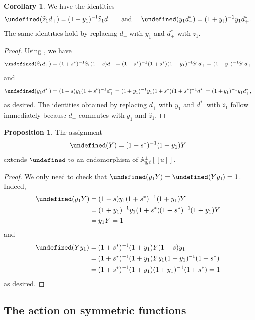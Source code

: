 \documentclass[reqno]{amsart}
\theoremstyle{plain}
\theoremstyle{definition}
\newtheorem{corollary}[theorem]{Corollary}
\newtheorem{proposition}[theorem]{Proposition}
\theoremstyle{remark}
\newcommand{\A}{\mathbb{A}}%
\newcommand{\z}{\widehat{z}}
\let\oldTheta\Theta
\let\Theta\undefined
\DeclareMathOperator{\Theta}{\oldTheta}
\newcommand{\<}{\langle}
\renewcommand{\>}{\rangle}
\begin{document}
\begin{corollary}
    \label{cor:theta_yz}
    We have the identities \[ \Theta(\z_1 d_+) = (1+y_1)^{-1} \z_1 d_+ \quad \text{ and } \quad \Theta(y_1 d_+^*) = (1+y_1)^{-1} y_1 d_+^*. \]
    The same identities hold by replacing $d_+$ with $y_1$ and $d_+^*$ with $\z_1$.
\end{corollary}

\begin{proof}
    Using , we have
    \[ \Theta(\z_1 d_+) = (1+s^*)^{-1} \z_1 (1-s) d_+ = (1+s^*)^{-1} (1 + s^*) (1 + y_1)^{-1} \z_1 d_+ = (1+y_1)^{-1} \z_1 d_+ \]
    and
    \[ \Theta(y_1 d_+^*) = (1-s) y_1 (1+s^*)^{-1} d_+^* = (1 + y_1)^{-1} y_1 (1 + s^*) (1+s^*)^{-1} d_+^* = (1+y_1)^{-1} y_1 d_+^*, \]
    as desired. The identities obtained by replacing $d_+$ with $y_1$ and $d_+^*$ with $\z_1$ follow immediately because $d_-$ commutes with $y_1$ and $\z_1$.
\end{proof}


\begin{proposition}
    The assignment
    \[ \Theta(Y) = (1+s^*)^{-1} (1+y_1) Y \]
    extends $\Theta$ to an endomorphism of $\A_{q,t}^\pm[[u]]$. 
\end{proposition}

\begin{proof}
    We only need to check that $\Theta(y_1 Y) = \Theta(Y y_1) = 1$. Indeed,
    \begin{align*}
        \Theta(y_1 Y) & = (1-s) y_1 (1+s^*)^{-1} (1+y_1) Y \\
        & = (1+y_1)^{-1} y_1 (1+s^*) (1+s^*)^{-1} (1+y_1) Y \\
        & = y_1 Y = 1 \\
    \end{align*}
    and
    \begin{align*}
        \Theta(Y y_1) & = (1+s^*)^{-1} (1+y_1) Y (1-s) y_1 \\
        & = (1+s^*)^{-1} (1+y_1) Y y_1 (1+y_1)^{-1} (1+s^*) \\
        & = (1+s^*)^{-1} (1+y_1) (1+y_1)^{-1} (1+s^*) = 1 \\
    \end{align*}
    as desired.    
\end{proof}

\subsection{The action on symmetric functions}
\end{document}
